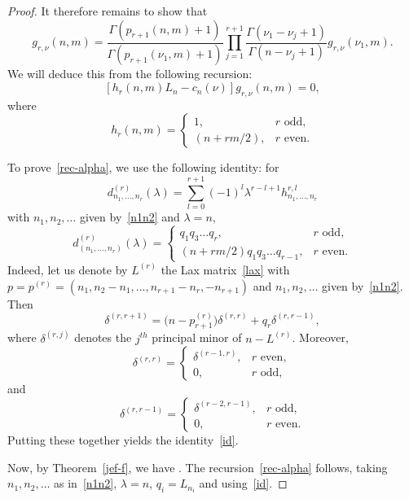 \documentclass[10pt,a4paper]{amsart}
\begin{document}
\begin{proof}
It therefore remains to show that
\[
g_{r,\nu}(n,m) = \frac{\Gamma(p_{r+1}(n,m)+1)}{\Gamma(p_{r+1}(\nu_1,m)+1)}
\prod_{j=1}^{r+1} \frac{\Gamma(\nu_1-\nu_j+1)}{\Gamma(n-\nu_j+1)} g_{r,\nu}(\nu_1,m).
\]
We will deduce this from the following recursion:
\begin{equation}\label{rec-alpha}[h_r(n,m) L_n - c_n(\nu)] g_{r,\nu}(n,m) = 0,\end{equation}
where
\[h_r(n,m)=\begin{cases}
1 ,& r \mbox{ odd},\\
(n+rm/2), & r \mbox{ even}.\end{cases}\]

To prove~\eqref{rec-alpha}, we use the following identity: for
\[d^{(r)}_{n_1,\dots,n_r}(\lambda) = \sum_{l=0}^{r+1} (-1)^l \lambda^{r-l+1} h^{r,l}_{n_1,\dots,n_r}\]
with $n_1,n_2,\dots$ given by~\eqref{n1n2} and $\lambda=n$,
\begin{equation}
\label{id} d^{(r)}_{(n_1,\dots,n_r)}(\lambda)=
\begin{cases} q_1q_3 \dots q_r, & r \mbox{ odd},\\
(n+rm/2) q_1q_3 \dots q_{r-1} ,& r \mbox{ even}.\end{cases}\end{equation}
Indeed, let us denote by $L^{(r)}$ the Lax matrix~\eqref{lax} with
$p=p^{(r)}=(n_1,n_2-n_1,\dots,n_{r+1}-n_r,-n_{r+1})$
and $n_1,n_2,\dots$ given by~\eqref{n1n2}.
Then
\[\delta^{(r,r+1)} = \big(n-p^{(r)}_{r+1}\big) \delta^{(r,r)} + q_r \delta^{(r,r-1)},\]
where $\delta^{(r,j)}$ denotes the $j^{th}$ principal minor of $n-L^{(r)}$.
Moreover,
\[\delta^{(r,r)}=\begin{cases}
\delta^{(r-1,r)}, & r \mbox{ even},\\
0, & r \mbox{ odd},\end{cases}\]
and
\[\delta^{(r,r-1)}=\begin{cases}
\delta^{(r-2,r-1)}, & r \mbox{ odd},\\
0 ,& r \mbox{ even}.\end{cases}\]
Putting these together yields the identity~\eqref{id}.

Now, by Theorem~\ref{jef-f}, we have
.
The recursion~\eqref{rec-alpha} follows, taking
$n_1,n_2,\dots$ as in~\eqref{n1n2}, $\lambda=n$, $q_i= L_{n_i}$
and using~\eqref{id}.
\end{proof}
\end{document}
